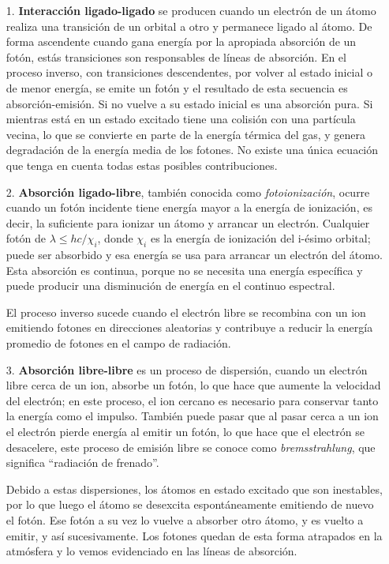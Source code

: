 \documentclass[12pt,oneside,openany,letter]{book}
\begin{document}
\begin{itemize}
    \item[1.] \textbf{Interacción ligado-ligado} se producen cuando un electrón de un átomo realiza una transición de un orbital a otro y permanece ligado al átomo. De forma ascendente cuando gana energía por la apropiada absorción de un fotón, estás transiciones son responsables de líneas de absorción. En el proceso inverso, con transiciones descendentes, por volver al estado inicial o de menor energía, se emite un fotón y el resultado de esta secuencia es absorción-emisión. Si no vuelve a su estado inicial es una absorción pura. Si mientras está en un estado excitado tiene una colisión con una partícula vecina, lo que se convierte en parte de la energía térmica del gas, y genera degradación de la energía media de los fotones. No existe una única ecuación que tenga en cuenta todas estas posibles contribuciones.
    
    \item[2.] \textbf{Absorción ligado-libre}, también conocida como \textit{fotoionización}, ocurre cuando un fotón incidente tiene energía mayor a la energía de ionización, es decir, la suficiente para ionizar un átomo y arrancar un electrón. Cualquier fotón de $\lambda \leq hc/\chi_i$, donde $\chi_i$ es la energía de ionización del i-ésimo orbital; puede ser absorbido y esa energía se usa para arrancar un electrón del átomo. Esta absorción es continua, porque no se necesita una energía específica y puede producir una disminución de energía en el continuo espectral. 
    
    El proceso inverso sucede cuando el electrón libre se recombina con un ion emitiendo fotones en direcciones aleatorias y contribuye a reducir la energía promedio de fotones en el campo de radiación.
    
    \item[3.] \textbf{Absorción libre-libre} es un proceso de dispersión, cuando un electrón libre cerca de un ion, absorbe un fotón, lo que hace que aumente la velocidad del electrón; en este proceso, el ion cercano es necesario para conservar tanto la energía como el impulso. También puede pasar que al pasar cerca a un ion el electrón pierde energía al emitir un fotón, lo que hace que el electrón se desacelere, este proceso de emisión libre se conoce como \textit{bremsstrahlung}, que significa ``radiación de frenado''.
    
    Debido a estas dispersiones, los átomos en estado excitado que son inestables, por lo que luego el átomo se desexcita espontáneamente emitiendo de nuevo el fotón. Ese fotón a su vez lo vuelve a absorber otro átomo, y es vuelto a emitir, y así sucesivamente. Los fotones quedan de esta forma atrapados en la atmósfera y lo vemos evidenciado en las líneas de absorción.
    

\end{itemize}
\end{document}
